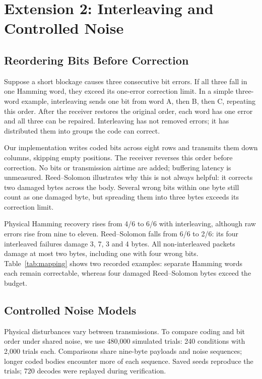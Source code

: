\documentclass[conference,a4paper]{IEEEtran}
\begin{document}
\section{Extension 2: Interleaving and Controlled Noise}
\label{sec:interleaving}
\subsection{Reordering Bits Before Correction}
Suppose a short blockage causes three consecutive bit errors. If all
three fall in one Hamming word, they exceed its one-error correction limit.
In a simple three-word example, interleaving sends one bit from word A,
then B, then C, repeating this order. After the receiver restores the
original order, each word has one error and all three can be repaired.
Interleaving has not removed errors; it has distributed them into groups
the code can correct.

Our implementation writes coded bits across eight rows and transmits them
down columns, skipping empty positions. The receiver reverses this order
before correction. No bits or transmission airtime are added; buffering
latency is unmeasured. Reed--Solomon illustrates why this is not always
helpful: it corrects two damaged bytes across the body. Several wrong bits
within one byte still count as one damaged byte, but spreading them into
three bytes exceeds its correction limit.

Physical Hamming recovery rises from 4/6 to 6/6 with interleaving, although
raw errors rise from nine to eleven. Reed--Solomon falls from 6/6 to 2/6:
its four interleaved failures damage 3, 7, 3 and 4 bytes. All non-interleaved
packets damage at most two bytes, including one with four wrong bits.
Table~\ref{tab:mapping} shows two recorded examples: separate Hamming
words each remain correctable, whereas four damaged Reed--Solomon bytes
exceed the budget.

\begin{table}[t]\caption{Recorded depth-eight examples from Video 19.
All indices start at zero; packets experienced separate disturbances.}
\label{tab:mapping}\centering\footnotesize

\end{table}

\subsection{Controlled Noise Models}
Physical disturbances vary between transmissions. To compare coding and
bit order under shared noise, we use 480,000 simulated trials: 240 conditions
with 2,000 trials each. Comparisons share nine-byte payloads and noise sequences; longer coded
bodies encounter more of each sequence. Saved seeds reproduce the trials;
720 decodes were replayed during verification.
\end{document}

